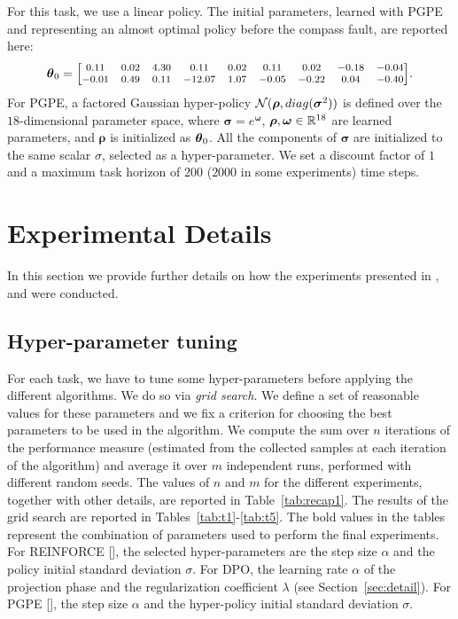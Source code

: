 For this task, we use a linear policy. The initial parameters, learned with \ac{PGPE} and representing an almost optimal policy before the compass fault, are reported here:
\[
\vtheta_{0} = 
\medmath{\begin{bmatrix}
0.11& 0.02& 4.30& 0.11& 0.02& 0.11& 0.02& -0.18& -0.04\\
-0.01& 0.49& 0.11& -12.07& 1.07& -0.05& -0.22& 0.04& -0.40\\
\end{bmatrix}}.
\]
For \ac{PGPE}, a factored Gaussian hyper-policy $\mathcal{N}(\boldsymbol{\rho},\mathop{diag}(\boldsymbol{\sigma}^2))$ is defined over the $18$-dimensional parameter space, where $\boldsymbol{\sigma}=e^{\boldsymbol{\omega}}$, $\boldsymbol{\rho},\boldsymbol{\omega}\in\mathbb{R}^{18}$ are learned parameters, and $\boldsymbol{\rho}$ is initialized as $\boldsymbol{\theta}_{0}$. All the components of $\boldsymbol{\sigma}$ are initialized to the same scalar $\sigma$, selected as a hyper-parameter.
We set a discount factor of $1$ and a maximum task horizon of $200$ ($2000$ in some experiments) time steps.

\section{Experimental Details}\label{sec:exp2}
In this section we provide further details on how the experiments presented in ,  and  were conducted. 

\subsection{Hyper-parameter tuning}
For each task, we have to tune some hyper-parameters before applying the different algorithms. We do so via \emph{grid search}. We define a set of reasonable values for these parameters and we fix a criterion for choosing the best parameters to be used in the algorithm. We compute the sum over $n$ iterations of the performance measure (estimated from the collected samples at each iteration of the algorithm) and average it over $m$ independent runs, performed with different random seeds. 
The values of $n$ and $m$ for the different experiments, together with other details, are reported in Table~\ref{tab:recap1}.
The results of the grid search are reported in Tables~\ref{tab:t1}-\ref{tab:t5}.
The bold values in the tables represent the combination of parameters used to perform the final experiments. For REINFORCE [\cite{williams1992simple}], the selected hyper-parameters are the step size $\alpha$ and the policy initial standard deviation $\sigma$. For \ac{DPO}, the learning rate $\alpha$ of the projection phase and the regularization coefficient $\lambda$ (see Section~\ref{sec:detail}). For \ac{PGPE} [\cite{sehnke2008policy}], the step size $\alpha$ and the hyper-policy initial standard deviation $\sigma$.

